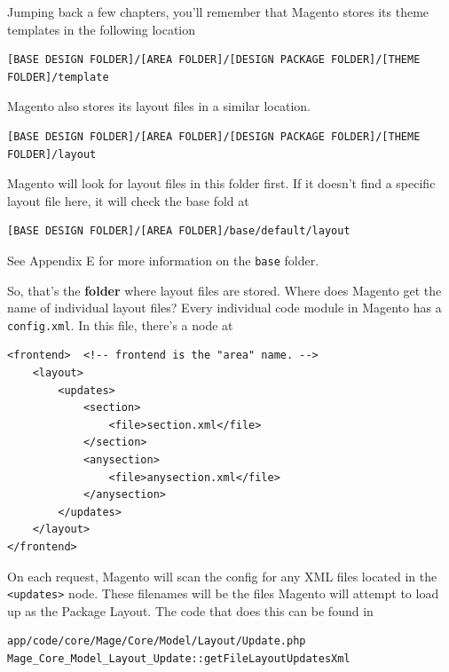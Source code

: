 \documentclass[oneside]{book}
\begin{document}
Jumping back a few chapters, you'll remember that Magento stores its theme templates in the following location

\begin{lstlisting}
[BASE DESIGN FOLDER]/[AREA FOLDER]/[DESIGN PACKAGE FOLDER]/[THEME FOLDER]/template

\end{lstlisting}


Magento also stores its layout files in a similar location.

\begin{lstlisting}
[BASE DESIGN FOLDER]/[AREA FOLDER]/[DESIGN PACKAGE FOLDER]/[THEME FOLDER]/layout

\end{lstlisting}


Magento will look for layout files in this folder first.  If it doesn't find a specific layout file here, it will check the base fold at

\begin{lstlisting}
[BASE DESIGN FOLDER]/[AREA FOLDER]/base/default/layout

\end{lstlisting}


See Appendix E for more information on the \footnotesize\texttt{base} \normalsize  folder.

So, that's the \textbf{folder} where layout files are stored.  Where does Magento get the name of individual layout files?  Every individual code module in Magento has a \footnotesize\texttt{config.xml}\normalsize.  In this file, there's a node at

\begin{lstlisting}
<frontend>  <!-- frontend is the "area" name. -->
    <layout>
        <updates>
            <section>
                <file>section.xml</file>
            </section>
            <anysection>
                <file>anysection.xml</file>
            </anysection>
        </updates>
    </layout>
</frontend>

\end{lstlisting}


On each request, Magento will scan the config for any XML files located in the  \footnotesize\texttt{\textless updates\textgreater } \normalsize  node.  These filenames will be the files Magento will attempt to load up as the Package Layout.  The code that does this can be found in

\begin{lstlisting}
app/code/core/Mage/Core/Model/Layout/Update.php
Mage_Core_Model_Layout_Update::getFileLayoutUpdatesXml

\end{lstlisting}
\end{document}
